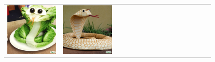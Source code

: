 \begin{figure}[ht!]
\begin{adjustwidth}{-0.8in}{-0.5in}
\begin{tabular}{cccccccccccccccccccc}
\multicolumn{3}{c}{\includegraphics[width=\twobytwocolwidth\textwidth]{figures/cherries/snake_salad.jpg}} &
\multicolumn{3}{c}{\includegraphics[width=\twobytwocolwidth\textwidth]{figures/cherries/snake_pancake.jpg}} &&

\end{tabular}
\end{adjustwidth}
\end{figure}
